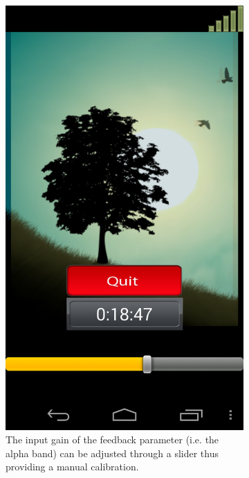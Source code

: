 \documentclass[a4paper,10pt,english,lof,lot,twoside]{puthesis}
\begin{document}
\begin{figure}
\begin{subfigure}[t]{0.30\linewidth}
\includegraphics[width=0.800\linewidth]{biozen_feedback_gain_control.png}
\caption[Gain alpha.]{The input gain of the feedback parameter (i.e. the alpha band) can be adjusted through a slider thus providing a manual calibration.}\label{ch-background/index:fig-background-biozen-feedback-gain-control}\end{subfigure}
\begin{subfigure}[t]{0.30\linewidth}
\centering
\capstart


\end{subfigure}
\end{figure}
\end{document}
